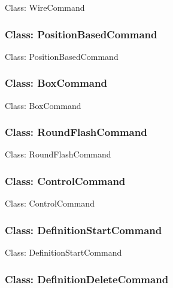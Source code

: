 \documentclass[11pt,twoside,openany,x11names,svgnames]{memoir}
\begin{document}
Class: WireCommand

\subsubsection{Class: PositionBasedCommand}\label{Class-PositionBasedCommand}

Class: PositionBasedCommand

\subsubsection{Class: BoxCommand}\label{Class-BoxCommand}

Class: BoxCommand

\subsubsection{Class: RoundFlashCommand}\label{Class-RoundFlashCommand}

Class: RoundFlashCommand

\subsubsection{Class: ControlCommand}\label{Class-ControlCommand}

Class: ControlCommand

\subsubsection{Class: DefinitionStartCommand}\label{Class-DefinitionStartCommand}

Class: DefinitionStartCommand

\subsubsection{Class: DefinitionDeleteCommand}\label{Class-DefinitionDeleteCommand}
\end{document}
